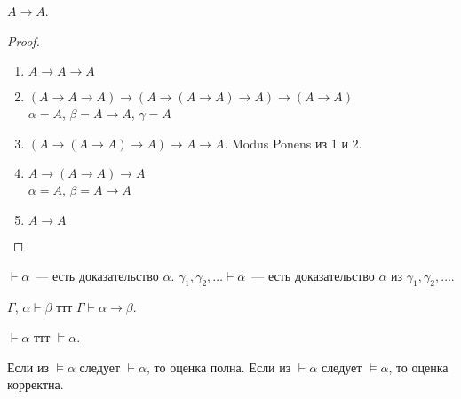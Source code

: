 \documentclass[12pt]{article}
\begin{document}
	\begin{statement}
		$A \rightarrow A$.
	\end{statement}
	\begin{proof}
		\begin{enumerate}
			\item $A \rightarrow A \rightarrow A$
			\item $(A \rightarrow A \rightarrow A) \rightarrow (A \rightarrow (A \rightarrow A) \rightarrow A) \rightarrow (A \rightarrow A)$ \\
			$\alpha = A$, $\beta = A \rightarrow A$, $\gamma = A$
			\item $(A \rightarrow (A \rightarrow A) \rightarrow A) \rightarrow A \rightarrow A$. Modus Ponens из 1 и 2.
			\item $A \rightarrow (A \rightarrow A) \rightarrow A $ \\
			$\alpha = A$, $\beta = A \rightarrow A$
			\item $A \rightarrow A$
		\end{enumerate}
	\end{proof}
	\begin{definition}
		$\vdash \alpha$~--- есть доказательство $\alpha$. $\gamma_1, \gamma_2, \dots \vdash \alpha$~--- есть доказательство $\alpha$ из $\gamma_1, \gamma_2, \dots$.
	\end{definition}
	\begin{theorem}
		$\Gamma$, $\alpha \vdash \beta$ ттт $\Gamma \vdash \alpha \rightarrow \beta$.
	\end{theorem}
	\begin{statement}
		$\vdash \alpha$ ттт $\vDash \alpha$.
	\end{statement}
	\begin{statement}
		Если из $\vDash \alpha$ следует $\vdash \alpha$, то оценка полна. Если из $\vdash \alpha$ следует $\vDash \alpha$, то оценка корректна.
	\end{statement}
\end{document}
